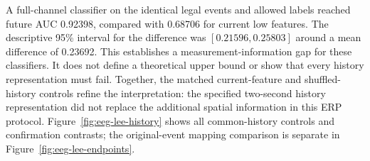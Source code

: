 \documentclass[11pt,a4paper]{article}
\begin{document}
A full-channel classifier on the identical legal events and allowed labels reached future AUC 0.92398, compared with 0.68706 for current low features. The descriptive 95\% interval for the difference was $[0.21596,0.25803]$ around a mean difference of 0.23692. This establishes a measurement-information gap for these classifiers. It does not define a theoretical upper bound or show that every history representation must fail. Together, the matched current-feature and shuffled-history controls refine the interpretation: the specified two-second history representation did not replace the additional spatial information in this ERP protocol. Figure~\ref{fig:eeg-lee-history} shows all common-history controls and confirmation contrasts; the original-event mapping comparison is separate in Figure~\ref{fig:eeg-lee-endpoints}.
\end{document}

